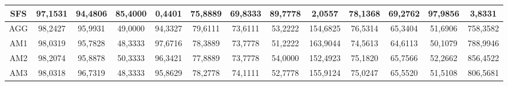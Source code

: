 \documentclass[12pt]{article}
\begin{document}
\begin{table}[H]
{\begin{tabular}{|c|cccc|cccc|cc|cc|}
SFS  & \multicolumn{1}{c|}{97,1531}                                                  & \multicolumn{1}{c|}{94,4806}                                                 & \multicolumn{1}{c|}{85,4000} & 0,4401  & \multicolumn{1}{c|}{75,8889}                                                  & \multicolumn{1}{c|}{69,8333}                                                 & \multicolumn{1}{c|}{89,7778} & 2,0557   & \multicolumn{1}{c|}{78,1368}                                                  & 69,2762                                                 & \multicolumn{1}{c|}{97,9856} & 3,8331   \\ \hline
AGG  & \multicolumn{1}{c|}{98,2427}                                                  & \multicolumn{1}{c|}{95,9931}                                                 & \multicolumn{1}{c|}{49,0000} & 94,3327 & \multicolumn{1}{c|}{79,6111}                                                  & \multicolumn{1}{c|}{73,6111}                                                 & \multicolumn{1}{c|}{53,2222} & 154,6825 & \multicolumn{1}{c|}{76,5314}                                                  & 65,3404                                                 & \multicolumn{1}{c|}{51,6906} & 758,3582 \\ \hline
AM1  & \multicolumn{1}{c|}{98,0319}                                                  & \multicolumn{1}{c|}{95,7828}                                                 & \multicolumn{1}{c|}{48,3333} & 97,6716 & \multicolumn{1}{c|}{78,3889}                                                  & \multicolumn{1}{c|}{73,7778}                                                 & \multicolumn{1}{c|}{51,2222} & 163,9044 & \multicolumn{1}{c|}{74,5613}                                                  & 64,6113                                                 & \multicolumn{1}{c|}{50,1079} & 788,9946 \\ \hline
AM2  & \multicolumn{1}{c|}{98,2074}                                                  & \multicolumn{1}{c|}{95,8878}                                                 & \multicolumn{1}{c|}{50,3333} & 96,3421 & \multicolumn{1}{c|}{77,8889}                                                  & \multicolumn{1}{c|}{73,7778}                                                 & \multicolumn{1}{c|}{54,0000} & 152,4923 & \multicolumn{1}{c|}{75,1820}                                                  & 65,7566                                                 & \multicolumn{1}{c|}{52,2662} & 856,4522 \\ \hline
AM3  & \multicolumn{1}{c|}{98,0318}                                                  & \multicolumn{1}{c|}{96,7319}                                                 & \multicolumn{1}{c|}{48,3333} & 95,8629 & \multicolumn{1}{c|}{78,2778}                                                  & \multicolumn{1}{c|}{74,1111}                                                 & \multicolumn{1}{c|}{52,7778} & 155,9124 & \multicolumn{1}{c|}{75,0247}                                                  & 65,5520                                                 & \multicolumn{1}{c|}{51,5108} & 806,5681 \\ \hline
\end{tabular}}
\end{table}
\end{document}
